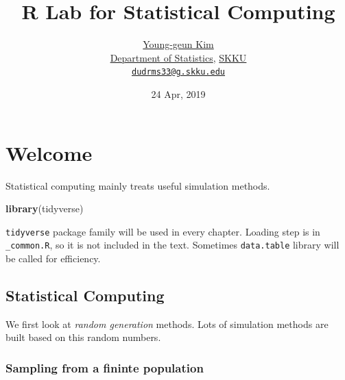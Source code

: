 \documentclass[]{book}
\title{R Lab for Statistical Computing}
\author{\href{https://github.com/ygeunkim}{Young-geun Kim}\\
\href{https://stat.skku.edu/stat/index.jsp}{Department of Statistics}, \href{https://www.skku.edu/skku/index.do}{SKKU}\\
\href{mailto:dudrms33@g.skku.edu}{\nolinkurl{dudrms33@g.skku.edu}}}
\date{24 Apr, 2019}
\newenvironment{Shaded}{\begin{snugshade}}{\end{snugshade}}
\newcommand{\KeywordTok}[1]{\textcolor[rgb]{0.13,0.29,0.53}{\textbf{#1}}}
\newcommand{\NormalTok}[1]{#1}
\let\oldmaketitle\maketitle
\theoremstyle{definition}
\theoremstyle{definition}
\theoremstyle{definition}
\theoremstyle{remark}
\begin{document}
\maketitle

\begin{titlepage}
  
\end{titlepage}

\let\maketitle\oldmaketitle
\maketitle

{
\setcounter{tocdepth}{1}
\tableofcontents
}
\hypertarget{welcome}{%
\chapter*{Welcome}\label{welcome}}

Statistical computing mainly treats useful simulation methods.

\begin{Shaded}
\begin{Highlighting}[]
\KeywordTok{library}\NormalTok{(tidyverse)}
\end{Highlighting}
\end{Shaded}

\texttt{tidyverse} package family will be used in every chapter. Loading step is in \texttt{\_common.R}, so it is not included in the text. Sometimes \texttt{data.table} library will be called for efficiency.

\hypertarget{statistical-computing}{%
\section*{Statistical Computing}\label{statistical-computing}}

We first look at \emph{random generation} methods. Lots of simulation methods are built based on this random numbers.

\hypertarget{sampling-from-a-fininte-population}{%
\subsection*{Sampling from a fininte population}\label{sampling-from-a-fininte-population}}
\end{document}
